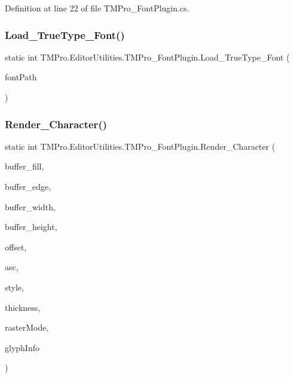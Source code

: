 Definition at line 22 of file T\+M\+Pro\+\_\+\+Font\+Plugin.\+cs.

\mbox{\label{class_t_m_pro_1_1_editor_utilities_1_1_t_m_pro___font_plugin_a724684e823e9bc0275d3e581bcd66fb0}} 
\subsubsection{\texorpdfstring{Load\_TrueType\_Font()}{Load\_TrueType\_Font()}}
{\footnotesize\ttfamily static int T\+M\+Pro.\+Editor\+Utilities.\+T\+M\+Pro\+\_\+\+Font\+Plugin.\+Load\+\_\+\+True\+Type\+\_\+\+Font (\begin{DoxyParamCaption}\item[{string}]{font\+Path }\end{DoxyParamCaption})}

\mbox{\label{class_t_m_pro_1_1_editor_utilities_1_1_t_m_pro___font_plugin_af185165e8b68a7719c139d3cae57c511}} 
\subsubsection{\texorpdfstring{Render\_Character()}{Render\_Character()}}
{\footnotesize\ttfamily static int T\+M\+Pro.\+Editor\+Utilities.\+T\+M\+Pro\+\_\+\+Font\+Plugin.\+Render\+\_\+\+Character (\begin{DoxyParamCaption}\item[{byte \mbox{[}$\,$\mbox{]}}]{buffer\+\_\+fill,  }\item[{byte \mbox{[}$\,$\mbox{]}}]{buffer\+\_\+edge,  }\item[{int}]{buffer\+\_\+width,  }\item[{int}]{buffer\+\_\+height,  }\item[{int}]{offset,  }\item[{int}]{asc,  }\item[{\mbox{\hyperlink{namespace_t_m_pro_1_1_editor_utilities_ae783a93ab603d30fd45ab0e3f3c67394}{Face\+Styles}}}]{style,  }\item[{float}]{thickness,  }\item[{\mbox{\hyperlink{namespace_t_m_pro_1_1_editor_utilities_ac956f92fd288b0b627522e75a9c5b9ad}{Render\+Modes}}}]{raster\+Mode,  }\item[{ref \mbox{\hyperlink{struct_t_m_pro_1_1_editor_utilities_1_1_f_t___glyph_info}{F\+T\+\_\+\+Glyph\+Info}}}]{glyph\+Info }\end{DoxyParamCaption})}

